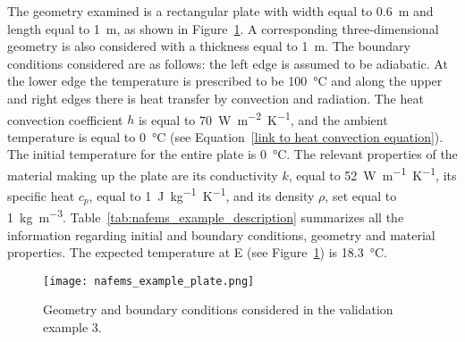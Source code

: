 The geometry examined is a rectangular plate with width equal to \SI{0.6}{\meter} and length equal to \SI{1}{\meter}, as shown in Figure~\ref{fig:nafems_example_plate}.
A corresponding three-dimensional geometry is also considered with a thickness equal to \SI{1}{\meter}.
The boundary conditions considered are as follows: the left edge is assumed to be adiabatic.
At the lower edge the temperature is prescribed to be \SI{100}{\celsius} and along the upper and right edges there is heat transfer by convection and radiation.
The heat convection coefficient \(h\) is equal to \SI{70}{\watt\meter^{-2}\kelvin^{-1}}, and the ambient temperature is equal to \SI{0}{\celsius} (see Equation~\ref{link to heat convection equation}).
The initial temperature for the entire plate is \SI{0}{\celsius}.
The relevant properties of the material making up the plate are its conductivity \(k\), equal to \SI{52}{\watt\meter^{-1}\kelvin^{-1}}, its specific heat \(c_p\), equal to \SI{1}{\joule\kilo\gram^{-1}\kelvin^{-1}}, and its density \(\rho\), set equal to \SI{1}{\kilo\gram\meter^{-3}}.
Table~\ref{tab:nafems_example_description} summarizes all the information regarding initial and boundary conditions, geometry and material properties.
The expected temperature at E (see Figure~\ref{fig:nafems_example_plate}) is \SI{18.3}{\celsius}.


\begin{figure}
  \centering
  \texttt{[image: nafems\_example\_plate.png]}
  \caption{Geometry and boundary conditions considered in the validation example 3.}
\label{fig:nafems_example_plate}
\end{figure}

